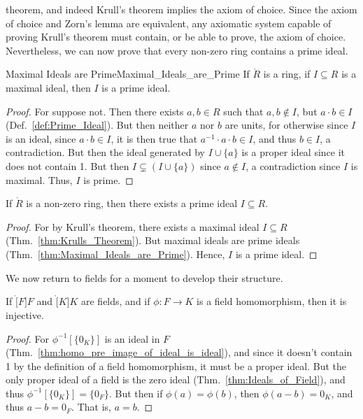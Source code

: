 \documentclass{article}                                                        %
\begin{document}
        theorem, and indeed Krull's theorem implies the axiom of choice. Since
        the axiom of choice and Zorn's lemma are equivalent, any axiomatic
        system capable of proving Krull's theorem must contain, or be able to
        prove, the axiom of choice. Nevertheless, we can now prove that every
        non-zero ring contains a prime ideal.
        \begin{ltheorem}{Maximal Ideals are Prime}{Maximal_Ideals_are_Prime}
            If $\ring{R}$ is a ring, if $I\subseteq{R}$ is a maximal ideal, then
            $I$ is a prime ideal.
        \end{ltheorem}
        \begin{proof}
            For suppose not. Then there exists $a,b\in{R}$ such that
            $a,b\notin{I}$, but $a\cdot{b}\in{I}$ (Def.~\ref{def:Prime_Ideal}).
            But then neither $a$ nor $b$ are units, for otherwise since $I$ is
            an ideal, since $a\cdot{b}\in{I}$, it is then true that
            $a^{\minus{1}}\cdot{a}\cdot{b}\in{I}$, and thus $b\in{I}$, a
            contradiction. But then the ideal generated by $I\cup\{a\}$ is a
            proper ideal since it does not contain 1. But then
            $I\subsetneq(I\cup\{a\})$ since $a\notin{I}$, a contradiction since
            $I$ is maximal. Thus, $I$ is prime.
        \end{proof}
        \begin{theorem}
            \label{thm:Existence_of_Prime_Ideals}%
            If $\ring{R}$ is a non-zero ring, then there exists a prime ideal
            $I\subseteq{R}$.
        \end{theorem}
        \begin{proof}
            For by Krull's theorem, there exists a maximal ideal
            $I\subseteq{R}$ (Thm.~\ref{thm:Krulls_Theorem}). But maximal ideals
            are prime ideals (Thm.~\ref{thm:Maximal_Ideals_are_Prime}). Hence,
            $I$ is a prime ideal.
        \end{proof}
        We now return to fields for a moment to develop their structure.
        \begin{theorem}
            If $\ring[F]{F}$ and $\ring[K]{K}$ are fields, and if
            $\phi:F\rightarrow{K}$ is a field homomorphism, then it is
            injective.
        \end{theorem}
        \begin{proof}
            For $\phi^{\minus{1}}[\{0_{K}\}]$ is an ideal in $F$
            (Thm.~\ref{thm:homo_pre_image_of_ideal_is_ideal}), and since it
            doesn't contain 1 by the definition of a field homomorphism, it
            must be a proper ideal. But the only proper ideal of a field is the
            zero ideal (Thm.~\ref{thm:Ideals_of_Field}), and thus
            $\phi^{\minus{1}}[\{0_{K}\}]=\{0_{F}\}$. But then if
            $\phi(a)=\phi(b)$, then $\phi(a-b)=0_{K}$, and thus $a-b=0_{F}$.
            That is, $a=b$.
        \end{proof}
\end{document}
